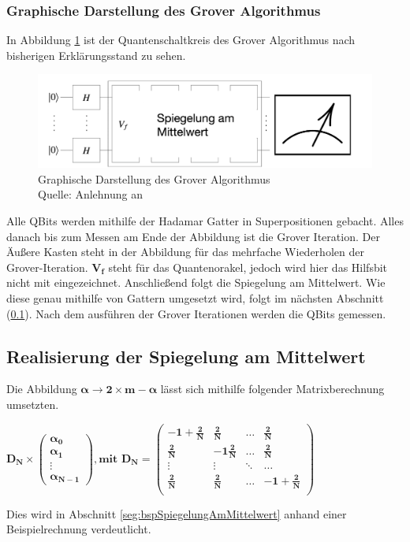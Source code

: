 \subsubsection{Graphische Darstellung des Grover Algorithmus}
In Abbildung \ref{fig:algoInformell} ist der Quantenschaltkreis des Grover Algorithmus nach bisherigen Erklärungsstand zu sehen.
\begin{figure}[hbtp]
	\centering
	\includegraphics[width=1\textwidth]{figures/algoInformell.png}
	\caption{Graphische Darstellung des Grover Algorithmus \\ Quelle: Anlehnung an \cite[S. 146]{Ho17}}
	\label{fig:algoInformell}
\end{figure}
Alle QBits werden mithilfe der Hadamar Gatter in Superpositionen gebacht. Alles danach bis zum Messen am Ende der Abbildung ist die Grover Iteration.
Der Äußere Kasten steht in der Abbildung für das mehrfache Wiederholen der Grover-Iteration. $\mathbf{V_f}$ steht für das Quantenorakel, jedoch wird hier das Hilfsbit nicht mit eingezeichnet. Anschließend folgt die Spiegelung am Mittelwert. Wie diese genau mithilfe von Gattern umgesetzt wird, folgt im nächsten Abschnitt (\ref{sec:realiserung}). Nach dem ausführen der Grover Iterationen werden die QBits gemessen.
\subsection{Realisierung der Spiegelung am Mittelwert}
\label{sec:realiserung}
Die Abbildung $\mathbf{\alpha \rightarrow 2 \times m - \alpha}$ lässt sich mithilfe folgender Matrixberechnung umsetzten.
\begin{center}
	$\mathbf{D_N \times 
	\begin{pmatrix}
			\alpha_0 \\ \alpha_1 \\ \vdots \\  \alpha_{N-1}
	\end{pmatrix}, \text{mit } D_N = 
	\begin{pmatrix}
			-1 + \frac{2}{N} & \frac{2}{N} & \dots& \frac{2}{N} \\
			\frac{2}{N} & -1 \frac{2}{N} & \dots& \frac{2}{N} \\
			\vdots & \vdots & \ddots& \dots \\
			 \frac{2}{N} & \frac{2}{N} & \dots& -1+ \frac{2}{N} \\
	\end{pmatrix}}$
\end{center}
Dies wird in Abschnitt \ref{seg:bspSpiegelungAmMittelwert} anhand einer Beispielrechnung verdeutlicht.
